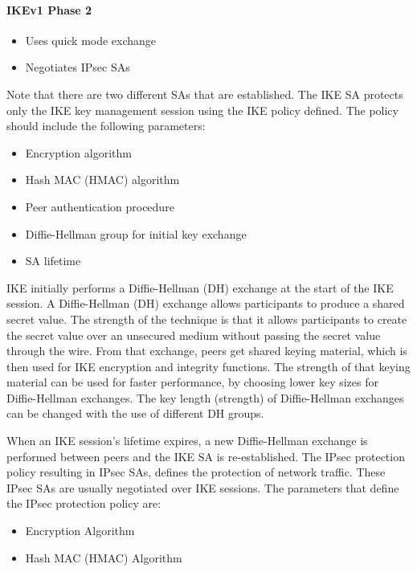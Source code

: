 \paragraph{IKEv1 Phase 2}
\begin{itemize}
    \item Uses quick mode exchange
    \item Negotiates IPsec SAs  
\end{itemize}
      
Note that there are two different SAs that are established. The IKE SA protects only the IKE key management session using the IKE policy defined. The policy should include the following parameters:
\begin{itemize}
    \item Encryption algorithm
    \item Hash MAC (HMAC) algorithm
    \item Peer authentication procedure
    \item Diffie-Hellman group for initial key exchange
    \item SA lifetime
\end{itemize}
          
IKE initially performs a Diffie-Hellman (DH) exchange at the start of the IKE session. A Diffie-Hellman (DH) exchange allows participants to produce a shared secret value. The strength of the technique is that it allows participants to create the secret value over an unsecured medium without passing the secret value through the wire. From that exchange, peers get shared keying material, which is then used for IKE encryption and integrity functions. The strength of that keying material can be used for faster performance, by choosing lower key sizes for Diffie-Hellman exchanges. The key length (strength) of Diffie-Hellman exchanges can be changed with the use of different DH groups.
  
When an IKE session's lifetime expires, a new Diffie-Hellman exchange is performed between peers and the IKE SA is re-established.
The IPsec protection policy resulting in IPsec SAs, defines the protection of network traffic. These IPsec SAs are usually negotiated over IKE sessions. The parameters that define the IPsec protection policy are:
\begin{itemize}
    \item Encryption Algorithm
    \item Hash MAC (HMAC) Algorithm  
\end{itemize}

